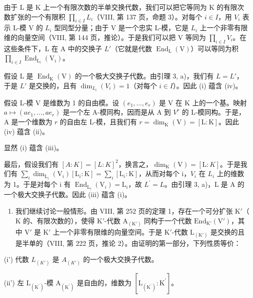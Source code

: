 由于 L 是 K 上一个有限次数的半单交换代数，我们可以把它等同为 K 的有限次数扩张的一个有限积 \(\prod_{i\in I}L_{i}\)（VIII, 第 137 页，命题 3）。对每个 \(i\in I\)，用 \(V_{i}\) 表示 L-模 V 的 \(L_{i}\) 型同型分量；由于 V 是一个忠实 L-模，它是 \(L_{i}\) 上一个非零有限维的向量空间（VIII, 第 144 页，推论）。于是我们可以把 V 等同为 \(\prod_{i\in I}V_{i}\)。在这些条件下，L 在 A 中的交换子 \(L'\)（它就是代数 \(\operatorname{End}_{\mathrm{L}}(\mathrm{V})\)）可以等同为积 \(\prod_{i\in I}\operatorname{End}_{\mathrm{L}_{i}}(\mathrm{V}_{i})\)。

假设 L 是 \(\operatorname{End}_{\mathrm{K}}(\mathrm{V})\) 的一个极大交换子代数。由引理 3, a)，我们有 \(L = L'\)，于是 \(L'\) 是交换的，且有 \(\dim_{L_i}(V_i) = 1\)（对每个 \(i \in I\)）。因此 (i) 蕴含 (iv)。

假设 L-模 V 是维数为 1 的自由模。设 \((e_{1},\ldots,e_{r})\) 是 V 在 K 上的一个基。映射 \(a\mapsto(ae_{1},\ldots,ae_{r})\) 是一个左 A-模同构，因而是从 A 到 \(V^{r}\) 的 L-模同构。于是，A 是一个维数为 \(r\) 的自由左 L-模，且我们有 \(r = \dim_{\mathrm{K}}(\mathrm{V}) = [\mathrm{L}:\mathrm{K}]\)。因此 (iv) 蕴含 (ii)。

显然 (i) 蕴含 (iii)。

最后，假设我们有 \([A:K]=[L:K]^{2}\)，换言之，\(\dim_{\mathrm{K}}(\mathrm{V})=[\mathrm{L}:K]\)。于是我们有 \(\sum_{i}\dim_{\mathrm{L}_{i}}(\mathrm{V}_{i})[\mathrm{L}_{i}:\mathrm{K}]=\sum_{i}[\mathrm{L}_{i}:\mathrm{K}]\)，从而对每个 i，\(V_{i}\) 在 \(L_{i}\) 上的维数为 1。于是对每个 i 有 \(\operatorname{End}_{\mathrm{L}_{i}}(\mathrm{V}_{i})=\mathrm{L}_{i}\)，故 \(L^{\prime}=L\)。由引理 3, a)，L 是 A 的一个极大交换子代数。因此 (iii) 蕴含 (i)。

\begin{enumerate}
\def\labelenumi{\Alph{enumi})}
\setcounter{enumi}{1}
\tightlist
\item
  我们继续讨论一般情形。由 VIII, 第 252 页的定理 1，存在一个可分扩张 \(\mathrm{K}'\)（\(\mathrm{K}\) 的、有限次数的），使得 \(\mathrm{K}'\)-代数 \(\mathrm{A}_{(\mathrm{K}')}\) 同构于一个代数 \(\mathrm{End}_{\mathrm{K}'}(\mathrm{V}')\)，其中 \(\mathrm{V}'\) 是 \(\mathrm{K}'\) 上一个非零有限维的向量空间。于是 \(\mathrm{K}'\)-代数 \(\mathrm{L}_{(\mathrm{K}')}\) 是交换的且是半单的（VIII, 第 222 页，推论 2）。由证明的第一部分，下列性质等价：
\end{enumerate}

(i') 代数 \(L_{(K')}\) 是 \(A_{(K')}\) 的一个极大交换子代数。

(ii') 左 \(\mathrm{L}_{(\mathrm{K}^{\prime})}\)-模 \(\mathrm{A}_{(\mathrm{K}^{\prime})}\) 是自由的，维数为 \([\mathrm{L}_{(\mathrm{K}^{\prime})}:\mathrm{K}^{\prime}]\)。

